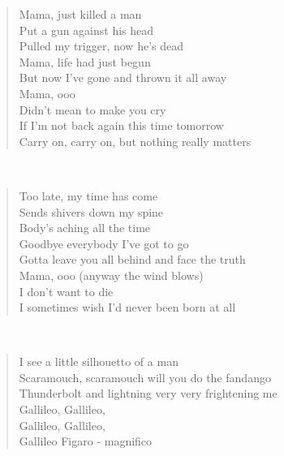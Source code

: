 \noindent\begin{minipage}{\linewidth}
\begin{verse}
	Mama, just killed a man\\
	Put a gun against his head\\
	Pulled my trigger, now he's dead\\
	Mama, life had just begun\\
	But now I've gone and thrown it all away\\
	Mama, ooo\\
	Didn't mean to make you cry\\
	If I'm not back again this time tomorrow\\
	Carry on, carry on, but nothing really matters\\
\end{verse}
\end{minipage}\\[10pt]
\noindent\begin{minipage}{\linewidth}
\begin{verse}
	Too late, my time has come\\
	Sends shivers down my spine\\
	Body's aching all the time\\
	Goodbye everybody I've got to go\\
	Gotta leave you all behind and face the truth\\
	Mama, ooo (anyway the wind blows)\\
	I don't want to die\\
	I sometimes wish I'd never been born at all\\
\end{verse}
\end{minipage}\\[10pt]
\noindent\begin{minipage}{\linewidth}
\begin{verse}
	I see a little silhouetto of a man\\
	Scaramouch, scaramouch will you do the fandango\\
	Thunderbolt and lightning very very frightening me\\
	Gallileo, Gallileo,\\
	Gallileo, Gallileo,\\
	Gallileo Figaro - magnifico\\
\end{verse}
\end{minipage}\\[10pt]
